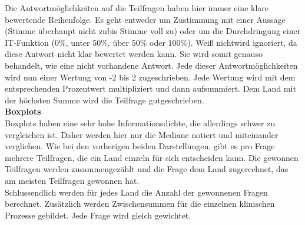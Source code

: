 	Die Antwortmöglichkeiten auf die Teilfragen haben hier immer eine klare bewertende Reihenfolge. Es geht entweder um Zustimmung mit einer Aussage (\glqq Stimme überhaupt nicht zu\grqq{ }bis \glqq Stimme voll zu\grqq) oder um die Durchdringung einer IT-Funktion (0\%, unter 50\%, über 50\% oder 100\%). \glqq Weiß nicht\grqq{ }wird ignoriert, da diese Antwort nicht klar bewertet werden kann. Sie wird somit genauso behandelt, wie eine nicht vorhandene Antwort. Jede dieser Antwortmöglichkeiten wird nun einer Wertung von -2 bis 2 zugeschrieben. Jede Wertung wird mit dem entsprechenden Prozentwert multipliziert und dann aufsummiert. Dem Land mit der höchsten Summe wird die Teilfrage gutgeschrieben.
	\vspace{\parheadvspace}\\
	\textbf{Boxplots}\\
	Boxplots haben eine sehr hohe Informationsdichte, die allerdings schwer zu vergleichen ist. Daher werden hier nur die Mediane notiert und miteinander verglichen. Wie bei den vorherigen beiden Darstellungen, gibt es pro Frage mehrere Teilfragen, die ein Land einzeln für sich entscheiden kann. Die gewonnen Teilfragen werden zusammengezählt und die Frage dem Land zugerechnet, das am meisten Teilfragen gewonnen hat.\\

	Schlussendlich werden für jedes Land die Anzahl der gewonnenen Fragen berechnet. Zusätzlich werden Zwischensummen für die einzelnen klinischen Prozesse gebildet. Jede Frage wird gleich gewichtet. 

